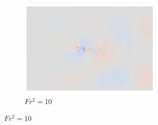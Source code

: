 \begin{figure}
\begin{subfigure}[b]{0.32\textwidth}
        \includegraphics[width=\textwidth]{images/spinning_ellipse/ar0p5fr3.png}
        \caption{$Fr^2 = 10$}
        \label{fig:ar0p5fr3}
    \end{subfigure}
    

\end{figure}
